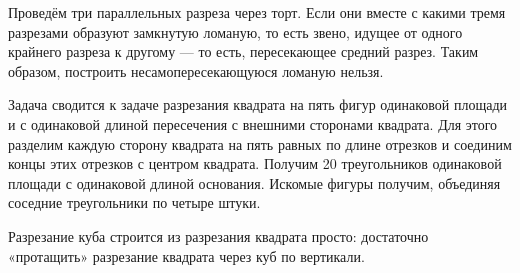 \begin{itemize}

\itA Проведём три параллельных разреза через торт. Если они вместе с какими тремя разрезами образуют замкнутую ломаную, то есть звено, идущее от одного крайнего разреза к другому — то есть, пересекающее средний разрез. Таким образом, построить несамопересекающуюся ломаную нельзя.


\itC Задача сводится к задаче разрезания квадрата на пять фигур одинаковой площади и с одинаковой длиной пересечения с внешними сторонами квадрата. Для этого разделим каждую сторону квадрата на пять равных по длине отрезков и соединим концы этих отрезков с центром квадрата. Получим 20 треугольников одинаковой площади с одинаковой длиной основания. Искомые фигуры получим, объединяя соседние треугольники по четыре штуки.

Разрезание куба строится из разрезания квадрата просто: достаточно «протащить» разрезание квадрата через куб по вертикали.
\end{itemize}